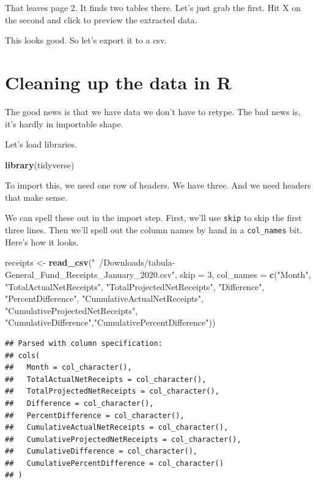 \documentclass[]{book}
\newenvironment{Shaded}{\begin{snugshade}}{\end{snugshade}}
\newcommand{\DataTypeTok}[1]{\textcolor[rgb]{0.13,0.29,0.53}{#1}}
\newcommand{\DecValTok}[1]{\textcolor[rgb]{0.00,0.00,0.81}{#1}}
\newcommand{\KeywordTok}[1]{\textcolor[rgb]{0.13,0.29,0.53}{\textbf{#1}}}
\newcommand{\NormalTok}[1]{#1}
\newcommand{\StringTok}[1]{\textcolor[rgb]{0.31,0.60,0.02}{#1}}
\begin{document}
That leaves page 2. It finds two tables there. Let's just grab the first. Hit X on the second and click to preview the extracted data.

This looks good. So let's export it to a csv.

\hypertarget{cleaning-up-the-data-in-r}{%
\section{Cleaning up the data in R}\label{cleaning-up-the-data-in-r}}

The good news is that we have data we don't have to retype. The bad news is, it's hardly in importable shape.

Let's load libraries.

\begin{Shaded}
\begin{Highlighting}[]
\KeywordTok{library}\NormalTok{(tidyverse)}
\end{Highlighting}
\end{Shaded}

To import this, we need one row of headers. We have three. And we need headers that make sense.

We can spell these out in the import step. First, we'll use \texttt{skip} to skip the first three lines. Then we'll spell out the column names by hand in a \texttt{col\_names} bit. Here's how it looks.

\begin{Shaded}
\begin{Highlighting}[]
\NormalTok{receipts <-}\StringTok{ }\KeywordTok{read_csv}\NormalTok{(}\StringTok{"~/Downloads/tabula-General_Fund_Receipts_January_2020.csv"}\NormalTok{, }\DataTypeTok{skip =} \DecValTok{3}\NormalTok{, }\DataTypeTok{col_names =} \KeywordTok{c}\NormalTok{(}\StringTok{"Month"}\NormalTok{, }\StringTok{"TotalActualNetReceipts"}\NormalTok{, }\StringTok{"TotalProjectedNetReceipts"}\NormalTok{, }\StringTok{"Difference"}\NormalTok{, }\StringTok{"PercentDifference"}\NormalTok{, }\StringTok{"CumulativeActualNetReceipts"}\NormalTok{, }\StringTok{"CumulativeProjectedNetReceipts"}\NormalTok{, }\StringTok{"CumulativeDifference"}\NormalTok{,}\StringTok{"CumulativePercentDifference"}\NormalTok{))}
\end{Highlighting}
\end{Shaded}

\begin{verbatim}
## Parsed with column specification:
## cols(
##   Month = col_character(),
##   TotalActualNetReceipts = col_character(),
##   TotalProjectedNetReceipts = col_character(),
##   Difference = col_character(),
##   PercentDifference = col_character(),
##   CumulativeActualNetReceipts = col_character(),
##   CumulativeProjectedNetReceipts = col_character(),
##   CumulativeDifference = col_character(),
##   CumulativePercentDifference = col_character()
## )
\end{verbatim}
\end{document}

